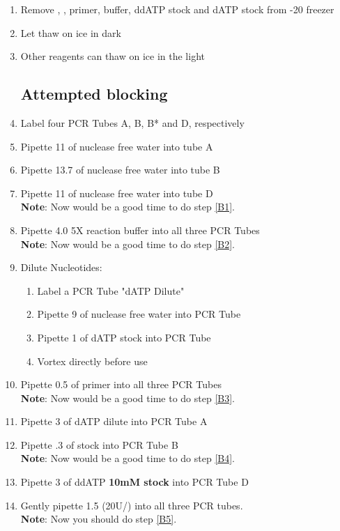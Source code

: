 \documentclass{ssiBio}
\begin{document}
\begin{enumerate}
\item{Remove \BdATP{}, \tdt{}, primer, \tdt{}  buffer, ddATP stock and dATP stock from -20\C{} freezer}
\item{Let \BdATP{} thaw on ice in dark}
\item{Other reagents can thaw on ice in the light}
\subsection{Attempted blocking}
\item{Label four PCR Tubes A, B, B* and D, respectively}
\item{Pipette 11\uL{} of nuclease free water into tube A}
\item{Pipette 13.7\uL{} of nuclease free water into tube B}
\item{Pipette 11\uL{} of nuclease free water into tube D}\\
	\textbf{Note}: Now would be a good time to do step \ref{B1}.
\item{Pipette 4.0\uL{} 5X \tdt{} reaction buffer into all three PCR Tubes}\\
	\textbf{Note}: Now would be a good time to do step \ref{B2}.
\item{Dilute Nucleotides:
\begin{enumerate}
\item{Label a PCR Tube "dATP Dilute"}
\item{Pipette 9\uL{} of nuclease free water into PCR Tube}
\item{Pipette 1\uL{} of dATP stock into PCR Tube}
\item{Vortex directly before use}
\end{enumerate}
}
\item{Pipette 0.5\uL{} of primer into all three PCR Tubes}\\
	\textbf{Note}: Now would be a good time to do step \ref{B3}.
\item{Pipette 3\uL{} of dATP dilute into PCR Tube A}
\item{Pipette .3\uL{} of \BdATP{} stock into PCR Tube B}\\ %
	\textbf{Note}: Now would be a good time to do step \ref{B4}.
\item{Pipette 3\uL{} of ddATP \textbf{10mM stock} into PCR Tube D}
\item{Gently pipette 1.5\uL{} \tdt (20U/\uL{}) into all three PCR tubes.}\\
	\textbf{Note}: Now you should do step \ref{B5}.


\end{enumerate}
\end{document}
